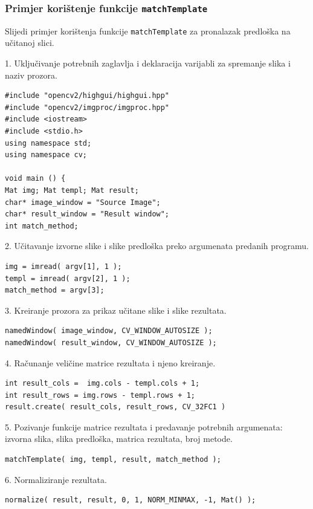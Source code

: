 \newpage
\subsubsection{Primjer korištenje funkcije \texttt{matchTemplate} } %
\label{ssub:Primjer korištenje funkcije }

Slijedi primjer korištenja funkcije \texttt{matchTemplate} za pronalazak
predloška na učitanoj slici.

1. Uključivanje potrebnih zaglavlja i deklaracija varijabli za spremanje
slika i naziv prozora.
\begin{lstlisting}[label=lst1,caption={}]
#include "opencv2/highgui/highgui.hpp"
#include "opencv2/imgproc/imgproc.hpp"
#include <iostream>
#include <stdio.h>
using namespace std;
using namespace cv;

void main () {
Mat img; Mat templ; Mat result;
char* image_window = "Source Image";
char* result_window = "Result window";
int match_method;
\end{lstlisting}

2. Učitavanje izvorne slike i slike predloška preko argumenata predanih
programu.
\begin{lstlisting}[caption={}]
img = imread( argv[1], 1 );
templ = imread( argv[2], 1 );
match_method = argv[3];
\end{lstlisting}

3. Kreiranje prozora za prikaz učitane slike i slike rezultata.
\begin{lstlisting}[caption={}]
namedWindow( image_window, CV_WINDOW_AUTOSIZE );
namedWindow( result_window, CV_WINDOW_AUTOSIZE );
\end{lstlisting}

4. Računanje veličine matrice rezultata i njeno kreiranje.
\begin{lstlisting}[caption={}]
int result_cols =  img.cols - templ.cols + 1;
int result_rows = img.rows - templ.rows + 1;
result.create( result_cols, result_rows, CV_32FC1 )
\end{lstlisting}

5. Pozivanje funkcije matrice rezultata i predavanje potrebnih
argumenata: izvorna slika, slika predloška, matrica rezultata, broj
metode.
\begin{lstlisting}[caption={}]
matchTemplate( img, templ, result, match_method );
\end{lstlisting}

6. Normaliziranje rezultata.
\begin{lstlisting}[caption={}]
normalize( result, result, 0, 1, NORM_MINMAX, -1, Mat() );
\end{lstlisting}

